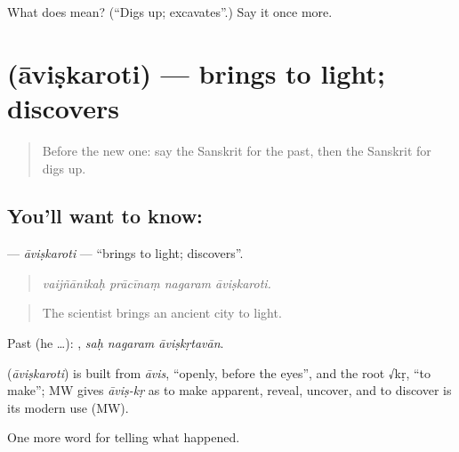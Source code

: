 \begin{tcolorbox}[breakable,colback=teal!4,colframe=teal!35!black,title={Before you move on}]
What does  mean? (\textquotedblleft{}Digs up; excavates\textquotedblright{}.) Say it once more.
\end{tcolorbox}
\section[\texorpdfstring{\sk{आविष्करोति} (āviṣkaroti)}{आविष्करोति (āviṣkaroti)}]{ (āviṣkaroti) — brings to light; discovers}

\label{lesson:SA-C323-aviskaroti}



\begin{quote}
Before the new one: say the Sanskrit for the past, then the Sanskrit for digs up.
\end{quote}

\subsection*{You'll want to know: }
\textbf{} — \emph{āviṣkaroti} — \textquotedblleft{}brings to light; discovers\textquotedblright{}.

\begin{quote}
   
\end{quote}

\begin{quote}
\emph{vaijñānikaḥ prācīnaṃ nagaram āviṣkaroti.}
\end{quote}

\begin{quote}
The scientist brings an ancient city to light.
\end{quote}

Past (he …):   , \emph{saḥ nagaram āviṣkṛtavān}.

\begin{cousinweb}
\textbf{} (\emph{āviṣkaroti}) is built from \emph{āvis}, \textquotedblleft{}openly, before the eyes\textquotedblright{}, and the root √kṛ, \textquotedblleft{}to make\textquotedblright{}; MW gives \emph{āviṣ-kṛ} as to make apparent, reveal, uncover, and to discover is its modern use (MW).
\end{cousinweb}

\begin{grammarlens}[title={What you've built}]
One more word for telling what happened.
\end{grammarlens}

